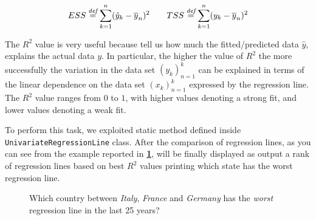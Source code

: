 \documentclass[sigconf]{acmart}
\begin{document}
\begin{equation}
ESS \overset{\textit{def}}{=} \sum_{k=1}^n (\hat{y}_k - \overline{y}_n)^2 \qquad TSS \overset{\textit{def}}{=} \sum_{k=1}^n (y_k - \overline{y}_n)^2
\end{equation}

The $R^2$ value is very useful because tell us how much the fitted/predicted data $\hat{y}$, explains the actual data $y$. In particular, the higher the value of $R^2$ the more successfully the variation in the data set $(y_k)^k_{n=1}$ can be explained in terms of the linear dependence on the data set $(x_k)^k_{n=1}$ expressed by the regression
line. The $R^2$ value ranges from $0$ to $1$, with higher values denoting a strong fit, and lower values denoting a weak fit.

To perform this task, we exploited  static method defined inside \texttt{UnivariateRegressionLine} class. After the comparison of regression lines, as you can see from the example reported in \textbf{\cref{ExampleComparison}}, will be finally displayed as output a rank of regression lines based on best $R^2$ values printing which state has the worst regression line.

\begin{figure}
    \caption{Which country between \textit{Italy}, \textit{France} and \textit{Germany} has the \textit{worst} regression line in the last 25 years?}%
    \label{ExampleComparison}%
\end{figure}


\FloatBarrier
\end{document}
